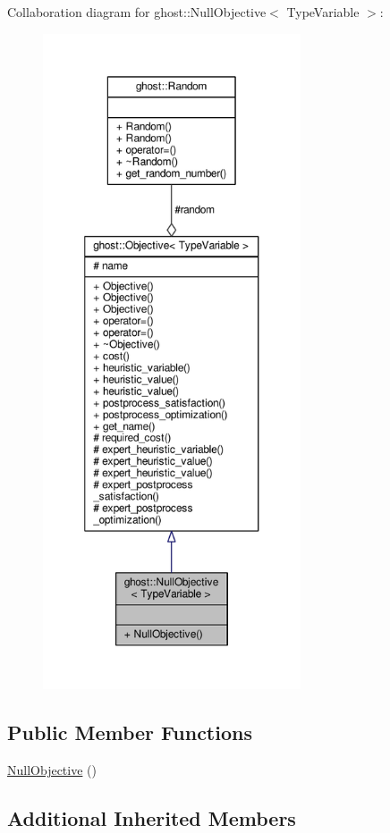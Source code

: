 Collaboration diagram for ghost\-:\-:Null\-Objective$<$ Type\-Variable $>$\-:
\nopagebreak
\begin{figure}[H]
\begin{center}
\leavevmode
\includegraphics[height=550pt]{classghost_1_1NullObjective__coll__graph}
\end{center}
\end{figure}
\subsection*{Public Member Functions}
\begin{DoxyCompactItemize}
\item 
\hyperlink{classghost_1_1NullObjective_a5c57ea84bfe1080ea756492dab255c12}{Null\-Objective} ()
\end{DoxyCompactItemize}
\subsection*{Additional Inherited Members}


